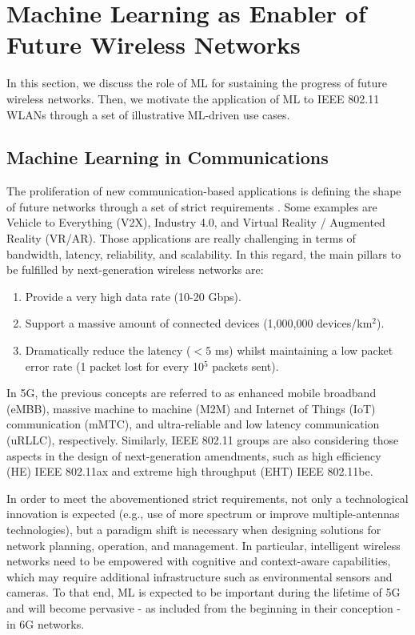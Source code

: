 \documentclass[journal]{IEEEtran}
\begin{document}
\section{Machine Learning as Enabler of Future Wireless Networks} 
\label{section:intro_ML}
In this section, we discuss the role of ML for sustaining the progress of future wireless networks. Then, we motivate the application of ML to IEEE 802.11 WLANs through a set of illustrative ML-driven use cases.

\subsection{Machine Learning in Communications}
The proliferation of new communication-based applications is defining the shape of future networks through a set of strict requirements \cite{itu2019use}. Some examples are Vehicle to Everything (V2X), Industry 4.0, and Virtual Reality / Augmented Reality (VR/AR). Those applications are really challenging in terms of bandwidth, latency, reliability, and scalability. In this regard, the main pillars to be fulfilled by next-generation wireless networks are:
\begin{enumerate}
	\item Provide a very high data rate (10-20 Gbps).
	\item Support a massive amount of connected devices (1,000,000 devices/km$^2$).
	\item Dramatically reduce the latency ($<5$ ms) whilst maintaining a low packet error rate (1 packet lost for every 10$^5$ packets sent).
\end{enumerate}

In 5G, the previous concepts are referred to as enhanced mobile broadband (eMBB), massive machine to machine (M2M) and Internet of Things (IoT) communication (mMTC), and ultra-reliable and low latency communication (uRLLC), respectively. Similarly, IEEE 802.11 groups are also considering those aspects in the design of next-generation amendments, such as high efficiency (HE) IEEE 802.11ax and extreme high throughput (EHT) IEEE 802.11be.

In order to meet the abovementioned strict requirements, not only a technological innovation is expected (e.g., use of more spectrum or improve multiple-antennas technologies), but a paradigm shift is necessary when designing solutions for network planning, operation, and management. In particular, intelligent wireless networks need to be empowered with cognitive and context-aware capabilities, which may require additional infrastructure such as environmental sensors and cameras. To that end, ML is expected to be important during the lifetime of 5G and will become pervasive - as included from the beginning in their conception - in 6G networks. 
\end{document}
